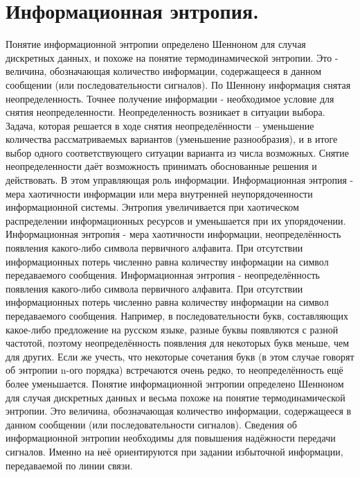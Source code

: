 \documentclass[bachelor, och, referat ]{SCWorks}
\begin{document}
\section{Информационная энтропия.}
Понятие информационной энтропии определено Шенноном для случая дискретных данных, и похоже на понятие термодинамической энтропии. Это - величина, обозначающая количество информации, содержащееся в данном сообщении (или последовательности сигналов). По Шеннону информация снятая неопределенность. Точнее получение информации - необходимое условие для снятия неопределенности. Неопределенность возникает в ситуации выбора. Задача, которая решается в ходе снятия неопределённости – уменьшение количества рассматриваемых вариантов (уменьшение разнообразия), и в итоге выбор одного соответствующего ситуации варианта из числа возможных. Снятие неопределенности даёт возможность принимать обоснованные решения и действовать. В этом управляющая роль информации. 
Информационная энтропия - мера хаотичности информации или мера внутренней неупорядоченности информационной системы. Энтропия увеличивается при хаотическом распределении информационных ресурсов и уменьшается при их упорядочении. 
Информационная энтропи́я - мера хаотичности информации, неопределённость появления какого-либо символа первичного алфавита. При отсутствии информационных потерь численно равна количеству информации на символ передаваемого сообщения. 
Информационная энтропия - неопределённость появления какого-либо символа первичного алфавита. При отсутствии информационных потерь численно равна количеству информации на символ передаваемого сообщения. Например, в последовательности букв, составляющих какое-либо предложение на русском языке, разные буквы появляются с разной частотой, поэтому неопределённость появления для некоторых букв меньше, чем для других. Если же учесть, что некоторые сочетания букв (в этом случае говорят об энтропии n-ого порядка) встречаются очень редко, то неопределённость ещё более уменьшается. Понятие информационной энтропии определено Шенноном для случая дискретных данных и весьма похоже на понятие термодинамической энтропии. Это величина, обозначающая количество информации, содержащееся в данном сообщении (или последовательности сигналов). Сведения об информационной энтропии необходимы для повышения надёжности передачи сигналов. Именно на неё ориентируются при задании избыточной информации, передаваемой по линии связи.

\newpage
\end{document}
